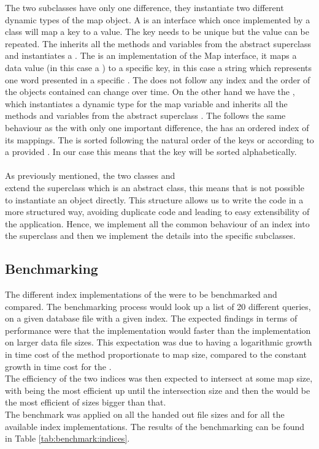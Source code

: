 The two subclasses have only one difference, they instantiate two different dynamic types of the map object. A  is an interface which once implemented by a class will map a key to a value. The key needs to be unique but the value can be repeated.
The  inherits all the methods and variables from the abstract superclass  and instantiates a . The  is an implementation of the Map interface, it maps a data value (in this case a ) to a specific key, in this case a string which represents one word presented in a specific . The  does not follow any index and the order of the objects contained can change over time.
On the other hand we have the , which instantiates a  dynamic type for the map variable and inherits all the methods and variables from the abstract superclass . The  follows the same behaviour as the  with only one important difference, the  has an ordered index of its mappings. The  is sorted following the natural order of the keys or according to a provided . In our case this means that the  key will be sorted alphabetically.\\ \\
As previously mentioned, the two classes  and \\  extend the superclass  which is an abstract class, this means that is not possible to instantiate an  object directly. This structure allows us to write the code in a more structured way, avoiding duplicate code and leading to easy extensibility of the application. Hence, we implement all the common behaviour of an index into the  superclass and then we implement the details into the specific subclasses.

\subsection{Benchmarking}
The different index implementations of the were to be benchmarked and compared. 
The benchmarking process would look up a list of 20 different queries, on a given database file with a given index. The expected findings in terms of performance were that the  implementation would faster than the  implementation on larger data file sizes. This expectation was due to  having a logarithmic growth in time cost of the  method proportionate to map size, compared to the constant growth in time cost for the . \\
The efficiency of the two indices was then expected to intersect at some map size, with  being the most efficient up until the intersection size and then the  would be the most efficient of sizes bigger than that. \\
The benchmark was applied on all the handed out file sizes and for all the available index implementations. The results of the benchmarking can be found in Table \ref{tab:benchmark:indices}.


